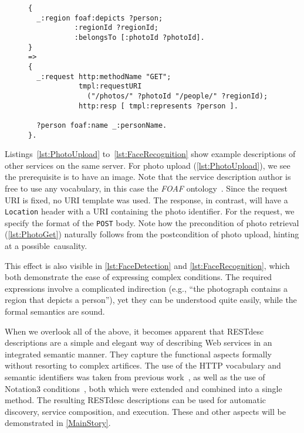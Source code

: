 \documentclass[runningheads,a4paper, twocolumn]{llncs}
\begin{document}
\begin{figure}[float=t!]
\begin{lstlisting}[caption=RESTdesc description of face recognition,
                   label=lst:FaceRecognition, escapechar=§, belowcaptionskip=0em]
{
  _:region foaf:depicts ?person;
           :regionId ?regionId;
           :belongsTo [:photoId ?photoId].
}
=>
{
  _:request http:methodName "GET";
            tmpl:requestURI
              ("/photos/" ?photoId "/people/" ?regionId);
            http:resp [ tmpl:represents ?person ].
  
  ?person foaf:name _:personName.
}.
\end{lstlisting}
\vspace{-2em}
\end{figure}

Listings~\ref{lst:PhotoUpload} to~\ref{lst:FaceRecognition} show example descriptions of other services on the same server. For photo upload (\autoref{lst:PhotoUpload}), we see the prerequisite is to have an image. Note that the service description author is free to use any vocabulary, in this case the \emph{FOAF} ontology~\cite{FOAF}. Since the request URI is fixed, no URI template was used. The response, in contrast, will have a \Verb!Location! header with a URI containing the photo identifier. For the request, we specify the format of the \Verb!POST! body. Note how the precondition of photo retrieval (\autoref{lst:PhotoGet}) naturally follows from the postcondition of photo upload, hinting at a possible~causality.

This effect is also visible in \autoref{lst:FaceDetection} and \autoref{lst:FaceRecognition}, which both demonstrate the ease of expressing complex conditions. The required expressions involve a complicated indirection (e.g., ``the photograph contains a region that depicts a person''), yet they can be understood quite easily, while the formal semantics are sound.

When we overlook all of the above, it becomes apparent that RESTdesc descriptions are a simple and elegant way of describing Web services in an integrated semantic manner. They capture the functional aspects formally without resorting to complex artifices. The use of the HTTP vocabulary and semantic identifiers was taken from previous work~\cite{Steiner:2011p5006}, as well as the use of \mbox{Notation3} conditions~\cite{Verborgh:2010p2746}, both which were extended and combined into a single method. The resulting \mbox{RESTdesc} descriptions can be used for automatic discovery, service composition, and execution. These and other aspects will be demonstrated in \autoref{MainStory}.
\end{document}
